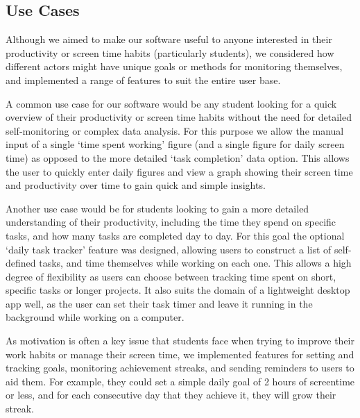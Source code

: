 \documentclass[12pt,a4paper]{article}
\begin{document}
\newpage
\subsection{Use Cases}
Although we aimed to make our software useful to anyone interested in their productivity or screen time habits (particularly students), we considered how different actors might have unique goals or methods for monitoring themselves, and implemented a range of features to suit the entire user base.

A common use case for our software would be any student looking for a quick overview of their productivity or screen time habits without the need for detailed self-monitoring or complex data analysis. For this purpose we allow the manual input of a single ‘time spent working’ figure (and a single figure for daily screen time) as opposed to the more detailed ‘task completion’ data option. This allows the user to quickly enter daily figures and view a graph showing their screen time and productivity over time to gain quick and simple insights.

Another use case would be for students looking to  gain a more detailed understanding of their productivity, including the time they spend on specific tasks, and how many tasks are completed day to day. For this goal the optional ‘daily task tracker’ feature was designed, allowing users to construct a list of self-defined tasks, and time themselves while working on each one. This allows a high degree of flexibility as users can choose between tracking time spent on short, specific tasks or longer projects. It also suits the domain of a lightweight desktop app well, as the user can set their task timer and leave it running in the background while working on a computer.

As motivation is often a key issue that students face when trying to improve their work habits or manage their screen time, we implemented features for setting and tracking goals, monitoring achievement streaks, and sending reminders to users to aid them. For example, they could set a simple daily goal of 2 hours of screentime or less, and for each consecutive day that they achieve it, they will grow their streak. 

\newpage
\end{document}
